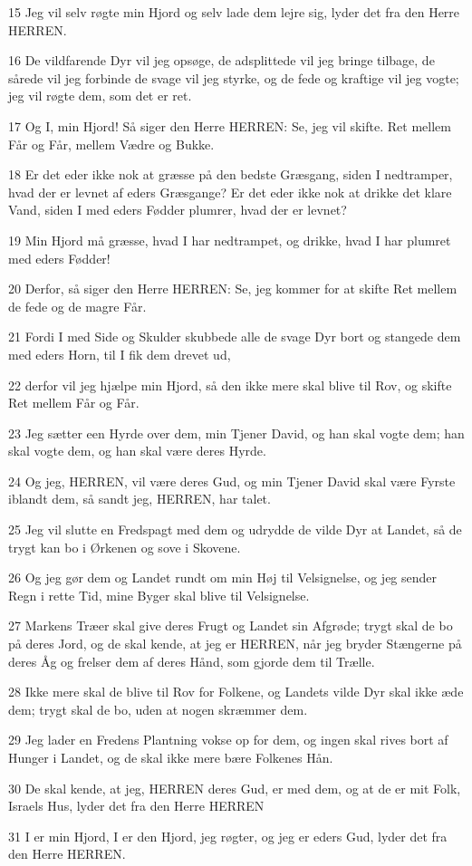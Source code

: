 \par 15 Jeg vil selv røgte min Hjord og selv lade dem lejre sig, lyder det fra den Herre HERREN.
\par 16 De vildfarende Dyr vil jeg opsøge, de adsplittede vil jeg bringe tilbage, de sårede vil jeg forbinde de svage vil jeg styrke, og de fede og kraftige vil jeg vogte; jeg vil røgte dem, som det er ret.
\par 17 Og I, min Hjord! Så siger den Herre HERREN: Se, jeg vil skifte. Ret mellem Får og Får, mellem Vædre og Bukke.
\par 18 Er det eder ikke nok at græsse på den bedste Græsgang, siden I nedtramper, hvad der er levnet af eders Græsgange? Er det eder ikke nok at drikke det klare Vand, siden I med eders Fødder plumrer, hvad der er levnet?
\par 19 Min Hjord må græsse, hvad I har nedtrampet, og drikke, hvad I har plumret med eders Fødder!
\par 20 Derfor, så siger den Herre HERREN: Se, jeg kommer for at skifte Ret mellem de fede og de magre Får.
\par 21 Fordi I med Side og Skulder skubbede alle de svage Dyr bort og stangede dem med eders Horn, til I fik dem drevet ud,
\par 22 derfor vil jeg hjælpe min Hjord, så den ikke mere skal blive til Rov, og skifte Ret mellem Får og Får.
\par 23 Jeg sætter een Hyrde over dem, min Tjener David, og han skal vogte dem; han skal vogte dem, og han skal være deres Hyrde.
\par 24 Og jeg, HERREN, vil være deres Gud, og min Tjener David skal være Fyrste iblandt dem, så sandt jeg, HERREN, har talet.
\par 25 Jeg vil slutte en Fredspagt med dem og udrydde de vilde Dyr at Landet, så de trygt kan bo i Ørkenen og sove i Skovene.
\par 26 Og jeg gør dem og Landet rundt om min Høj til Velsignelse, og jeg sender Regn i rette Tid, mine Byger skal blive til Velsignelse.
\par 27 Markens Træer skal give deres Frugt og Landet sin Afgrøde; trygt skal de bo på deres Jord, og de skal kende, at jeg er HERREN, når jeg bryder Stængerne på deres Åg og frelser dem af deres Hånd, som gjorde dem til Trælle.
\par 28 Ikke mere skal de blive til Rov for Folkene, og Landets vilde Dyr skal ikke æde dem; trygt skal de bo, uden at nogen skræmmer dem.
\par 29 Jeg lader en Fredens Plantning vokse op for dem, og ingen skal rives bort af Hunger i Landet, og de skal ikke mere bære Folkenes Hån.
\par 30 De skal kende, at jeg, HERREN deres Gud, er med dem, og at de er mit Folk, Israels Hus, lyder det fra den Herre HERREN
\par 31 I er min Hjord, I er den Hjord, jeg røgter, og jeg er eders Gud, lyder det fra den Herre HERREN.

